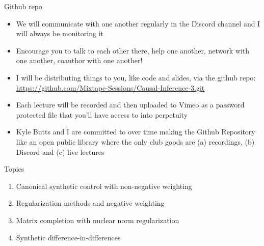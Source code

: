 \documentclass{beamer}
\begin{document}





\begin{frame}{Github repo}

  \begin{itemize}
    \item We will communicate with one another regularly in the Discord channel and I will always be monitoring it
    \item Encourage you to talk to each other there, help one another, network with one another, coauthor with one another!
    \item I will be distributing things to you, like code and slides, via the github repo: \url{https://github.com/Mixtape-Sessions/Causal-Inference-3.git}
    \item Each lecture will be recorded and then uploaded to Vimeo as a password protected file that you'll have access to into perpetuity
    \item Kyle Butts and I are committed to over time making the Github Repository like an open public library where the only club goods are (a) recordings, (b) Discord and (c) live lectures
  \end{itemize}

\end{frame}

\begin{frame}{Topics}

  \begin{enumerate}
    \item Canonical synthetic control with non-negative weighting
    \item Regularization methods and negative weighting
	\item Matrix completion with nuclear norm regularization
	\item Synthetic difference-in-differences
  \end{enumerate}

\end{frame}
\end{document}

